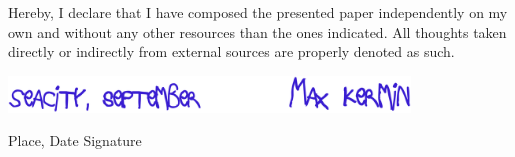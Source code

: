 \documentclass[12pt,paper=A4,numbers=noenddot,bibliography=totoc,listof=totoc,DIV=11,BCOR=1mm]{scrreprt}
\begin{document}

\listoffigures

\lstlistoflistings



\clearpage
\begin{center}
	\colorbox{ghell}{%
		\parbox{0.8\linewidth}{
		Hereby, I declare that I have composed the presented paper independently on my own and without any 				other resources than the ones indicated. All thoughts taken directly or indirectly from external 				sources are properly denoted as such.
		\par
		\begin{center}
		\includegraphics[width=0.8\textwidth]{bilder/sign}
		\end{center}
		\hspace*{0.8cm}Place, Date \hfill Signature\hspace*{0.8cm}
		}
	}
\end{center}
\end{document}
